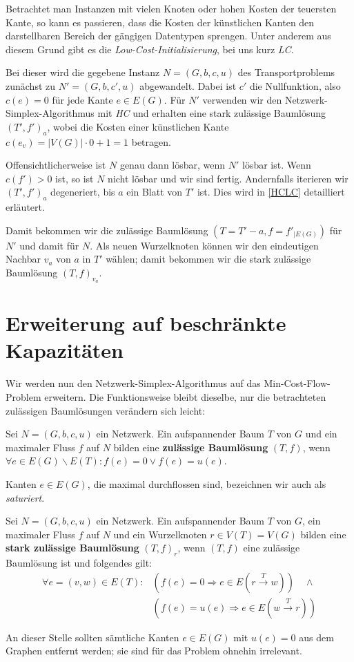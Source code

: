 Betrachtet man Instanzen mit vielen Knoten oder hohen Kosten der teuersten Kante, so kann es passieren, dass die Kosten der künstlichen Kanten den darstellbaren Bereich der gängigen Datentypen sprengen. Unter anderem aus diesem Grund gibt es die \emph{Low-Cost-Initialisierung}, bei uns kurz \emph{LC}.

Bei dieser wird die gegebene Instanz $N=(G,b,c,u)$ des Transportproblems zunächst zu $N'=(G,b,c',u)$ abgewandelt. Dabei ist $c'$ die Nullfunktion, also $c(e)=0$ für jede Kante $e\in E(G)$. Für $N'$ verwenden wir den Netzwerk-Simplex-Algorithmus mit \emph{HC} und erhalten eine stark zulässige Baumlösung $(T',f')_a$, wobei die Kosten einer künstlichen Kante $c(e_v)=|V(G)|\cdot0+1=1$ betragen.

Offensichtlicherweise ist $N$ genau dann lösbar, wenn $N'$ lösbar ist. Wenn $c(f')>0$ ist, so ist $N$ nicht lösbar und wir sind fertig. Andernfalls iterieren wir $(T',f')_a$ degeneriert, bis $a$ ein Blatt von $T'$ ist. Dies wird in \cref{HCLC} detailliert erläutert.

Damit bekommen wir die zulässige Baumlösung $(T=T'-a, f=f'_{|E(G)})$ für $N'$ und damit für $N$. Als neuen Wurzelknoten können wir den eindeutigen Nachbar $v_a$ von $a$ in $T'$ wählen; damit bekommen wir die stark zulässige Baumlösung $(T,f)_{v_a}$.

\section{Erweiterung auf beschränkte Kapazitäten}\label{ch:alg2}
Wir werden nun den Netzwerk-Simplex-Algorithmus auf das Min-Cost-Flow-Problem erweitern. Die Funktionsweise bleibt dieselbe, nur die betrachteten zulässigen Baumlösungen verändern sich leicht:

\begin{defn}Sei $N=(G,b,c,u)$ ein Netzwerk. Ein aufspannender Baum $T$ von $G$ und ein maximaler Fluss $f$ auf $N$ bilden eine \textbf{zulässige Baumlösung} $(T,f)$, wenn $\forall e\in E(G)\backslash E(T): f(e) = 0\vee f(e)=u(e)$.\end{defn}
\begin{anm}Kanten $e\in E(G)$, die maximal durchflossen sind, bezeichnen wir auch als \emph{saturiert}.\end{anm}

\begin{defn}Sei $N=(G,b,c,u)$ ein Netzwerk. Ein aufspannender Baum $T$ von $G$, ein maximaler Fluss $f$ auf $N$ und ein Wurzelknoten $r\in V(T)=V(G)$ bilden eine \textbf{stark zulässige Baumlösung} $(T,f)_r$, wenn $(T,f)$ eine zulässige Baumlösung ist und folgendes gilt:
\begin{align*}
\forall e=(v,w)\in E(T): &{}(f(e)=0 \Rightarrow e\in E(r\xrightarrow{T}w))\quad\wedge\\
&{}(f(e)=u(e) \Rightarrow e\in E(w\xrightarrow{T}r))
\end{align*}\end{defn}
\begin{anm}An dieser Stelle sollten sämtliche Kanten $e\in E(G)$ mit $u(e)=0$ aus dem Graphen entfernt werden; sie sind für das Problem ohnehin irrelevant.\end{anm}

